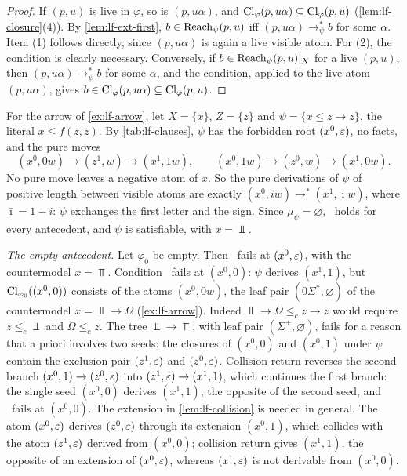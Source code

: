 \begin{proof}
If $(p,u)$ is live in $\varphi$, so is $(p,u\alpha)$, and
$\operatorname{Cl}_\varphi(p,u\alpha)\subseteq\operatorname{Cl}_\varphi(p,u)$
(\cref{lem:lf-closure}(4)). By \cref{lem:lf-ext-first}, $b\in \operatorname{Reach}_\psi(p,u)$
iff $(p,u\alpha)\to^*_\psi b$ for some $\alpha$. Item (1) follows directly,
since $(p,u\alpha)$ is again a live visible atom. For (2), the condition is
clearly necessary. Conversely, if $b\in \operatorname{Reach}_\psi(p,u)|_X$ for a live $(p,u)$,
then $(p,u\alpha)\to^*_\psi b$ for some $\alpha$, and the condition, applied
to the live atom $(p,u\alpha)$, gives
$b\in\operatorname{Cl}_\varphi(p,u\alpha)\subseteq\operatorname{Cl}_\varphi(p,u)$.
\end{proof}

\begin{example}\label{ex:ch-arrow}
For the arrow of \cref{ex:lf-arrow}, let $X=\{x\}$, $Z=\{z\}$ and
$\psi=\{x\le z\to z\}$, the literal $x\le f(z,z)$. By
\cref{tab:lf-clauses}, $\psi$ has the forbidden root $(x^0,\varepsilon)$, no
facts, and the pure moves
\[
 (x^0,0w)\to(z^1,w)\to(x^1,1w),\qquad (x^0,1w)\to(z^0,w)\to(x^1,0w).
\]
No pure move leaves a negative atom of $x$. So the pure derivations of $\psi$
of positive length between visible atoms are exactly
$(x^0,iw)\to^*(x^1,\bar\imath w)$, where $\bar\imath=1-i$: $\psi$ exchanges
the first letter and the sign. Since $\mu_\psi=\varnothing$, \CondI\ holds for
every antecedent, and $\psi$ is satisfiable, with $x=\Bot$.

\emph{The empty antecedent.} Let $\varphi_0$ be empty. Then \CondU\ fails at
$(x^0,\varepsilon)$, with the countermodel $x=\Top$. Condition \CondII\ fails at
$(x^0,0)$: $\psi$ derives $(x^1,1)$, but $\operatorname{Cl}_{\varphi_0}((x^0,0))$ consists of
the atoms $(x^0,0w)$, the leaf pair $(0\Sigma^*,\varnothing)$ of the
countermodel $x=\Bot\to\Omega$ (\cref{ex:lf-arrow}). Indeed
$\Bot\to\Omega\le_c z\to z$ would require $z\le_c\Bot$ and $\Omega\le_c z$.
The tree $\Bot\to\Top$, with leaf pair $(\Sigma^+,\varnothing)$, fails for a
reason that a priori involves two seeds: the closures of $(x^0,0)$ and
$(x^0,1)$ under $\psi$ contain the exclusion pair $(z^1,\varepsilon)$ and
$(z^0,\varepsilon)$. Collision return reverses the second branch
$(x^0,1)\to(z^0,\varepsilon)$ into $(z^1,\varepsilon)\to(x^1,1)$, which continues the first
branch: the single seed $(x^0,0)$ derives $(x^1,1)$, the opposite of the
second seed, and \CondII\ fails at $(x^0,0)$. The extension in
\cref{lem:lf-collision} is needed in general. The atom $(x^0,\varepsilon)$ derives
$(z^0,\varepsilon)$ through its extension $(x^0,1)$, which collides with the atom
$(z^1,\varepsilon)$ derived from $(x^0,0)$; collision return gives $(x^1,1)$, the
opposite of an extension of $(x^0,\varepsilon)$, whereas $(x^1,\varepsilon)$ is not
derivable from $(x^0,0)$.


\end{example}
